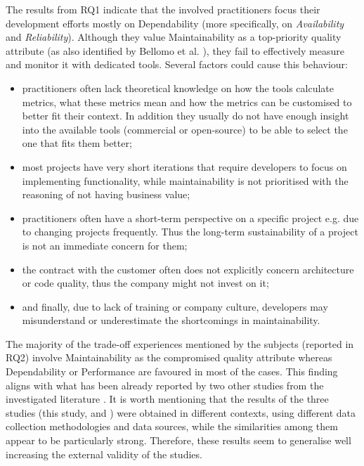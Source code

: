 The results from RQ1 indicate that the involved practitioners focus their development efforts mostly on Dependability (more specifically, on \textit{Availability} and \textit{Reliability}). Although they value Maintainability as a top-priority quality attribute (as also identified by Bellomo et al. \cite{Bellomo2015}), they fail to effectively measure and monitor it with dedicated tools.
Several factors could cause this behaviour:
\begin{itemize}
    \item practitioners often lack theoretical knowledge on how the tools calculate metrics, what these metrics mean and how the metrics can be customised to better fit their context. In addition they usually do not have enough insight into the available tools (commercial or open-source) to be able to select the one that fits them better;

    \item most projects have very short iterations that require developers to focus on implementing functionality, while maintainability is not prioritised with the reasoning of not having business value;

    \item practitioners often have a short-term perspective on a specific project e.g. due to changing projects frequently. Thus the long-term sustainability of a project is not an immediate concern for them;
    
    \item the contract with the customer often does not explicitly concern architecture or code quality, thus the company might not invest on it;
    
    \item and finally, due to lack of training or company culture, developers may misunderstand or underestimate the shortcomings in maintainability.

\end{itemize}

The majority of the trade-off experiences mentioned by the subjects (reported in RQ2) involve Maintainability as the compromised quality attribute whereas Dependability or Performance are favoured in most of the cases.
This finding aligns with what has been already reported by two other studies from the investigated literature \cite{Ampatzoglou2016,Feitosa2015}.
It is worth mentioning that the results of the three studies (this study, \cite{Ampatzoglou2016} and \cite{Feitosa2015}) were obtained in different contexts, using different data collection methodologies and data sources, while the similarities among them appear to be particularly strong. Therefore, these results seem to generalise well increasing the external validity of the studies.

